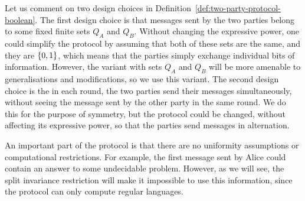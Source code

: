 Let us comment on two design choices in Definition~\ref{def:two-party-protocol-boolean}. The first design choice is that messages sent by the two parties belong to some fixed finite sets $Q_A$ and $Q_B$. Without changing the expressive power, one could simplify the protocol by assuming that both of these sets are the same, and they are $\{0,1\}$, which means that the parties simply exchange individual bits of information. However, the variant with sets $Q_A$ and $Q_B$ will be more amenable to generalisations and modifications, so we use this variant. The second design choice is the in each round, the two parties send their messages simultaneously, without seeing the message sent by the other party in the same round. We do this for the purpose of symmetry, but the protocol could be changed, without affecting its expressive power, so that the parties send messages in alternation.

An important part of the protocol is that there are no uniformity assumptions or computational restrictions. For example, the first message sent by Alice could contain an answer to some undecidable problem. However, as we will see, the split invariance restriction will make it impossible to use this information, since the protocol can only compute regular languages. 

